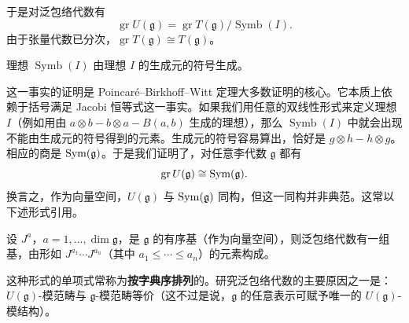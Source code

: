 
于是对泛包络代数有
\[
    \operatorname{gr}U(\mathfrak g)=\operatorname{gr}T(\mathfrak g)/\operatorname{Symb}(I).
\]
由于张量代数已分次，$\operatorname{gr}T(\mathfrak g)\cong T(\mathfrak g)$。

\begin{lemma}
    理想 $\operatorname{Symb}(I)$ 由理想 $I$ 的生成元的符号生成。
\end{lemma}


这一事实的证明是 Poincaré--Birkhoff--Witt 定理大多数证明的核心。它本质上依赖于括号满足 Jacobi 恒等式这一事实。如果我们用任意的双线性形式来定义理想 $I$（例如用由 $a\otimes b-b\otimes a-B(a,b)$ 生成的理想），那么 $\operatorname{Symb}(I)$ 中就会出现不能由生成元的符号得到的元素。生成元的符号容易算出，恰好是 $g\otimes h-h\otimes g$。相应的商是 $\operatorname{Sym}(\mathfrak g)$。于是我们证明了，对任意李代数 $\mathfrak g$ 都有
\[
    \operatorname{gr}U(\mathfrak g)\cong\operatorname{Sym}(\mathfrak g).
\]
换言之，作为向量空间，$U(\mathfrak g)$ 与 $\operatorname{Sym}(\mathfrak g)$ 同构，但这一同构并非典范。这常以下述形式引用。

\begin{theorem}
    设 $J^a$，$a=1,\dots,\dim\mathfrak g$，是 $\mathfrak g$ 的有序基（作为向量空间），则泛包络代数有一组基，由形如 $J^{a_1}\cdots J^{a_n}$（其中 $a_1\le\cdots\le a_n$）的元素构成。
\end{theorem}


这种形式的单项式常称为\textbf{按字典序排列}的。研究泛包络代数的主要原因之一是：$U(\mathfrak g)$-模范畴与 $\mathfrak g$-模范畴等价（这不过是说，$\mathfrak g$ 的任意表示可赋予唯一的 $U(\mathfrak g)$-模结构）。

